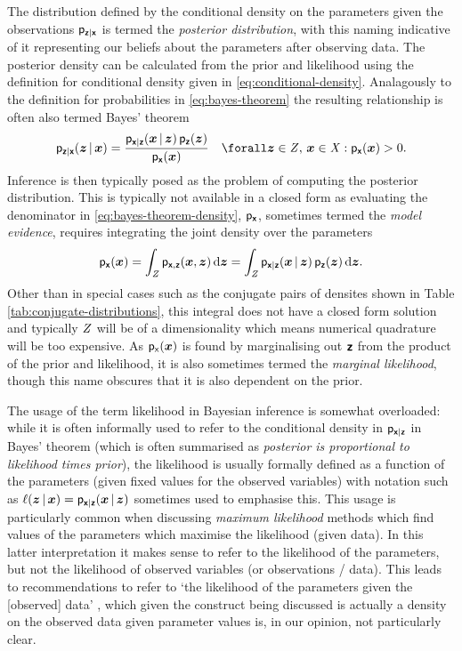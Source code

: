 The distribution defined by the conditional density on the parameters given the observations $\mathsf{p}_{\boldsymbol{\mathsf{z}}|\boldsymbol{\mathsf{x}}}$ is termed the \emph{posterior distribution}, with this naming indicative of it representing our beliefs about the parameters after observing data. The posterior density can be calculated from the prior and likelihood using the definition for conditional density given in \eqref{eq:conditional-density}. Analagously to the definition for probabilities in \eqref{eq:bayes-theorem} the resulting relationship is often also termed Bayes' theorem
\begin{equation}\label{eq:bayes-theorem-density}
 \pden{\rvct{z}|\rvct{x}}(\vct{z}\gvn\vct{x}) =
 \frac{\pden{\rvct{x}|\rvct{z}}(\vct{x}\gvn\vct{z})\,\pden{\rvct{z}}(\vct{z})}{\pden{\rvct{x}}(\vct{x})}
 \quad \forall \vct{z} \in \set{Z},\,\vct{x} \in \set{X} : \pden{\rvct{x}}(\vct{x}) > 0.
\end{equation}
Inference is then typically posed as the problem of computing the posterior distribution. This is typically not available in a closed form as evaluating the denominator in \eqref{eq:bayes-theorem-density}, $\mathsf{p}_{\boldsymbol{\mathsf{x}}}$, sometimes termed the \emph{model evidence}, requires integrating the joint density over the parameters
\begin{equation}\label{eq:model-evidence-integral}
 \mathsf{p}_{\boldsymbol{\mathsf{x}}}(\boldsymbol{x}) = 
 \int_{\mathit{Z}} \mathsf{p}_{\boldsymbol{\mathsf{x}},\boldsymbol{\mathsf{z}}}(\boldsymbol{x},\boldsymbol{z})\,\mathrm{d}\boldsymbol{z} =
 \int_{\mathit{Z}} \mathsf{p}_{\boldsymbol{\mathsf{x}}|\boldsymbol{\mathsf{z}}}(\boldsymbol{x}\operatorname{|}\boldsymbol{z})\,\mathsf{p}_{\boldsymbol{\mathsf{z}}}(\boldsymbol{z})
 \,\mathrm{d}\boldsymbol{z}.
\end{equation}
Other than in special cases such as the conjugate pairs of densites shown in Table \ref{tab:conjugate-distributions}, this integral does not have a closed form solution and typically $\mathit{Z}$ will be of a dimensionality which means numerical quadrature will be too expensive. As $\mathsf{p}_{\mathsf{x}}(\boldsymbol{x})$ is found by marginalising out $\boldsymbol{\mathsf{z}}$ from the product of the prior and likelihood, it is also sometimes termed the \emph{marginal likelihood}, though this name obscures that it is also dependent on the prior.

The usage of the term likelihood in Bayesian inference is somewhat overloaded: while it is often informally used to refer to the conditional density in $\mathsf{p}_{\boldsymbol{\mathsf{x}}|\boldsymbol{\mathsf{z}}}$ in Bayes' theorem (which is often summarised as \emph{posterior is proportional to likelihood times prior}), the likelihood is usually formally defined as a function of the parameters (given fixed values for the observed variables) with notation such as $\ell(\boldsymbol{z} \operatorname{|} \boldsymbol{x}) = \mathsf{p}_{\boldsymbol{\mathsf{x}}|\boldsymbol{\mathsf{z}}}(\boldsymbol{x}\operatorname{|}\boldsymbol{z})$ sometimes used to emphasise this. This usage is particularly common when discussing \emph{maximum likelihood} methods which find values of the parameters which maximise the likelihood (given data). In this latter interpretation it makes sense to refer to the likelihood of the parameters, but not the likelihood of observed variables (or observations / data). This leads to recommendations to refer to `the likelihood of the parameters given the [observed] data' \citep{mackay2003information}, which given the construct being discussed is actually a density on the observed data given parameter values is, in our opinion, not particularly clear.

